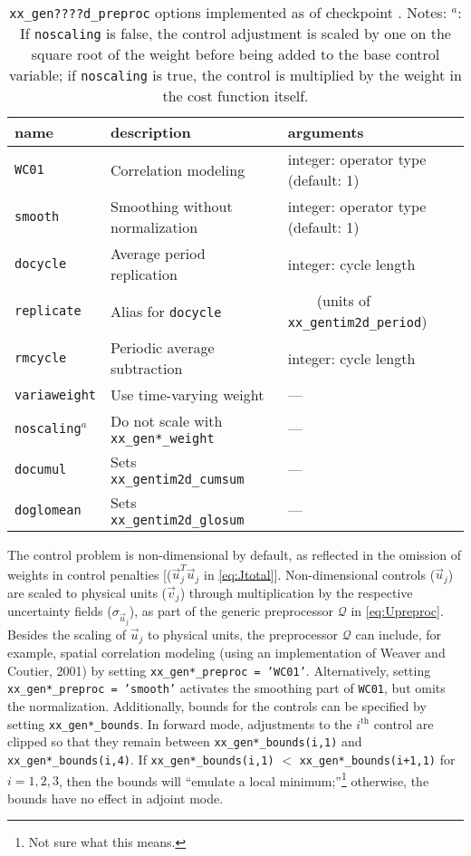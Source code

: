 \begin{table}[!ht]
\centering
\begin{tabular}{lll}
name								&	description							&	arguments \\ \hline\hline
\texttt{WC01} 						&	Correlation modeling 				&	integer: operator type (default: 1) \\
\texttt{smooth}						&	Smoothing without normalization 	&	integer: operator type (default: 1) \\
\texttt{docycle}					&	Average period replication			&	integer: cycle length \\
\texttt{replicate}					&	Alias for \texttt{docycle}				&	\ \ \ \ (units of \texttt{xx\_gentim2d\_period}) \\
\texttt{rmcycle} 					&	Periodic average subtraction		&	integer: cycle length \\
\texttt{variaweight}				&	Use time-varying weight				&	--- \\
\texttt{noscaling}$^{a}$			&	Do not scale with \texttt{xx\_gen*\_weight} & --- \\
\texttt{documul}					&	Sets \texttt{xx\_gentim2d\_cumsum} 	& ---\\
\texttt{doglomean}					&	Sets \texttt{xx\_gentim2d\_glosum} 	& --- \\
\end{tabular} 
\caption{\texttt{xx\_gen????d\_preproc} options implemented as of checkpoint \mitgcmCheckpointVersion. Notes: $^a$: If \texttt{noscaling} is false, the control adjustment is scaled by one on the square root of the weight before being added to the base control variable; if \texttt{noscaling} is true, the control is multiplied by the weight in the cost function itself.}
\label{tbl:gencost_ctrl_preproc}
\end{table}

The control problem is non-dimensional by default, as reflected in the omission of weights in control penalties [($\vec{u}_j^T\vec{u}_j$ in \eqref{eq:Jtotal}]. Non-dimensional controls ($\vec{u}_j$) are scaled to physical units ($\vec{v}_j$) through multiplication by the respective uncertainty fields ($\sigma_{\vec{u}_j}$), as part of the generic preprocessor $\mathcal{Q}$ in \eqref{eq:Upreproc}. Besides the scaling of $\vec{u}_j$ to physical units, the preprocessor $\mathcal{Q}$ can include, for example, spatial correlation modeling (using an implementation of Weaver and Coutier, 2001) by setting \texttt{xx\_gen*\_preproc = 'WC01'}. Alternatively, setting \texttt{xx\_gen*\_preproc = 'smooth'} activates the smoothing part of \texttt{WC01}, but omits the normalization. Additionally, bounds for the controls can be specified by setting \texttt{xx\_gen*\_bounds}. In forward mode, adjustments to the $i^\text{th}$ control are clipped so that they remain between \texttt{xx\_gen*\_bounds(i,1)} and \texttt{xx\_gen*\_bounds(i,4)}. If \texttt{xx\_gen*\_bounds(i,1)} $<$ \texttt{xx\_gen*\_bounds(i+1,1)} for $i = 1, 2, 3$, then the bounds will ``emulate a local minimum;''\footnote{Not sure what this means.} otherwise, the bounds have no effect in adjoint mode.

